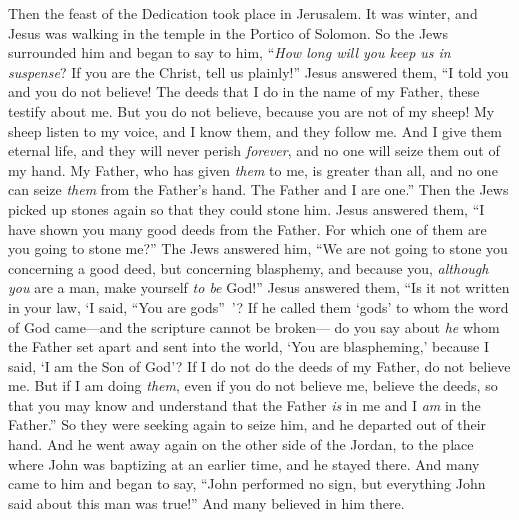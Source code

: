 \begin{biblechapter}
 Then the feast of the Dedication took place in Jerusalem. It was winter,
\verse and Jesus was walking in the temple in the Portico of Solomon.
\verse So the Jews surrounded him and began to say to him, “\textit{How long will you keep us in suspense}? If you are the Christ, tell us plainly!”
\verse Jesus answered them, “I told you and you do not believe! The deeds that I do in the name of my Father, these testify about me.
\verse But you do not believe, because you are not of my sheep!
\verse My sheep listen to my voice, and I know them, and they follow me.
\verse And I give them eternal life, and they will never perish \textit{forever}, and no one will seize them out of my hand.
\verse My Father, who has given \textit{them} to me, is greater than all, and no one can seize \textit{them} from the Father’s hand.
\verse The Father and I are one.”
\verse Then the Jews picked up stones again so that they could stone him.
\verse Jesus answered them, “I have shown you many good deeds from the Father. For which one of them are you going to stone me?”
\verse The Jews answered him, “We are not going to stone you concerning a good deed, but concerning blasphemy, and because you, \textit{although you} are a man, make yourself \textit{to be} God!”
\verse Jesus answered them, “Is it not written in your law, ‘I said, “You are gods” ’?
\verse If he called them ‘gods’ to whom the word of God came—and the scripture cannot be broken—
\verse do you say about \textit{he} whom the Father set apart and sent into the world, ‘You are blaspheming,’ because I said, ‘I am the Son of God’?
\verse If I do not do the deeds of my Father, do not believe me.
\verse But if I am doing \textit{them}, even if you do not believe me, believe the deeds, so that you may know and understand that the Father \textit{is} in me and I \textit{am} in the Father.”
\verse So they were seeking again to seize him, and he departed out of their hand.
\verse And he went away again on the other side of the Jordan, to the place where John was baptizing at an earlier time, and he stayed there.
\verse And many came to him and began to say, “John performed no sign, but everything John said about this man was true!”
\verse And many believed in him there.
\end{biblechapter}

